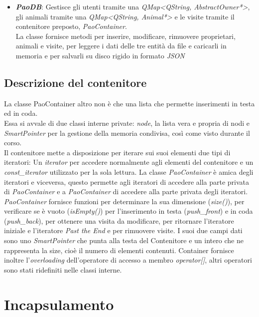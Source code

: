  \begin{itemize}
 	\item \textit{\textbf{PaoDB}}: Gestisce gli utenti tramite una \textit{QMap<QString, AbstractOwner*>}, gli animali tramite una \textit{QMap<QString, Animal*>} e le visite tramite il contenitore preposto, \textit{PaoContainer}. \\ La classe fornisce metodi per inserire, modificare, rimuovere proprietari, animali e visite, per leggere i dati delle tre entità da file e caricarli in memoria e per salvarli su disco rigido in formato \textit{JSON}
 \end{itemize}
 
 
 \subsection{Descrizione del contenitore}
 La classe PaoContainer altro non è che una lista che permette inserimenti in testa ed in coda. \\Essa si avvale di due classi interne private: \textit{node}, la lista vera e propria di nodi e \textit{SmartPointer} per la gestione della memoria condivisa, così come visto durante il corso. 
 \\ Il contenitore mette a disposizione per iterare sui suoi elementi due tipi di iteratori: Un \textit{iterator} per accedere normalmente agli elementi del contenitore e un \textit{const\_iterator} utilizzato per la sola lettura. La classe \textit{PaoContainer} è amica degli iteratori e viceversa, questo permette agli iteratori di accedere alla parte privata di \textit{PaoContainer} e a \textit{PaoContainer} di accedere alla parte privata degli iteratori. \\ 
 
 \textit{PaoContainer} fornisce funzioni per determinare la sua dimensione (\textit{size()}), per verificare se è vuoto (\textit{isEmpty()}) per l'inserimento in testa (\textit{push\_front}) e in coda (\textit{push\_back}), per ottenere una visita da modificare, per ritornare l'iteratore iniziale e l'iteratore \textit{Past the End} e per rimuovere visite.
 I suoi due campi dati sono uno \textit{SmartPointer} che punta alla testa del Contenitore e un intero che ne rappresenta la size, cioè il numero di elementi contenuti. Container fornisce inoltre l'\textit{overloading} dell'operatore di accesso a membro \textit{operator[]}, altri operatori sono stati ridefiniti nelle classi interne.
 
\section{Incapsulamento}

